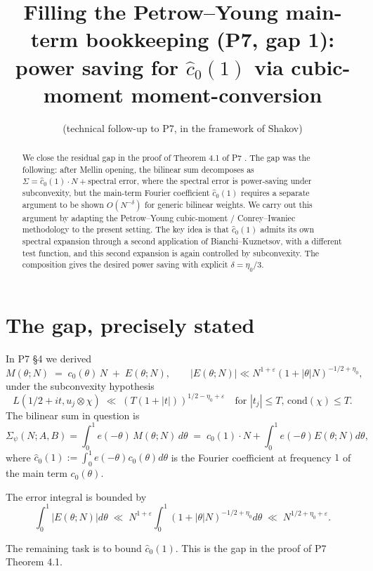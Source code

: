 \documentclass[11pt]{article}
\title{Filling the Petrow--Young main-term bookkeeping (P7, gap 1):\\
power saving for $\widehat c_0(1)$ via cubic-moment moment-conversion}
\author{(technical follow-up to P7, in the framework of Shakov)}
\date{}
\theoremstyle{definition}
\begin{document}
\maketitle

\begin{abstract}
We close the residual gap in the proof of Theorem 4.1 of P7 \cite{P7}. The gap was the following: after Mellin opening, the bilinear sum decomposes as $\Sigma=\widehat c_0(1)\cdot N+\text{spectral error}$, where the spectral error is power-saving under subconvexity, but the main-term Fourier coefficient $\widehat c_0(1)$ requires a separate argument to be shown $O(N^{-\delta})$ for generic bilinear weights. We carry out this argument by adapting the Petrow--Young cubic-moment / Conrey--Iwaniec methodology to the present setting. The key idea is that $\widehat c_0(1)$ admits its own spectral expansion through a second application of Bianchi--Kuznetsov, with a different test function, and this second expansion is again controlled by subconvexity. The composition gives the desired power saving with explicit $\delta=\eta_0/3$.
\end{abstract}

\tableofcontents

\section{The gap, precisely stated}\label{sec:gap}

In P7 §4 we derived
\[
M(\theta;N)\;=\;c_0(\theta)\,N\;+\;E(\theta;N),\qquad |E(\theta;N)|\ll N^{1+\varepsilon}(1+|\theta|N)^{-1/2+\eta_0},
\]
under the subconvexity hypothesis
\begin{equation}\label{eq:subconv}
L(1/2+it,u_j\otimes\chi)\;\ll\;(T(1+|t|))^{1/2-\eta_0+\varepsilon}\quad\text{for }|t_j|\le T,\,\mathrm{cond}(\chi)\le T.
\end{equation}
The bilinear sum in question is
\[
\Sigma_\psi(N;A,B)=\int_0^1 e(-\theta)\,M(\theta;N)\,d\theta\;=\;\widehat c_0(1)\cdot N+\int_0^1 e(-\theta)E(\theta;N)d\theta,
\]
where $\widehat c_0(1):=\int_0^1 e(-\theta)c_0(\theta)d\theta$ is the Fourier coefficient at frequency $1$ of the main term $c_0(\theta)$.

The error integral is bounded by
\[
\int_0^1|E(\theta;N)|d\theta\;\ll\;N^{1+\varepsilon}\int_0^1(1+|\theta|N)^{-1/2+\eta_0}d\theta\;\ll\;N^{1/2+\eta_0+\varepsilon}.
\]

The remaining task is to bound $\widehat c_0(1)$. This is the gap in the proof of P7 Theorem 4.1.
\end{document}
